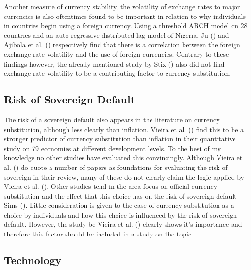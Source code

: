 \documentclass[
]{article}
\begin{document}
Another measure of currency stability, the volatility of exchange rates to major currencies is also oftentimes found to be important in relation to why individuals in countries begin using a foreign currency. Using a threshold ARCH model on 28 countries and an auto regressive distributed lag model of Nigeria, Ju () and Ajibola et al. () respectively find that there is a correlation between the foreign exchange rate volatility and the use of foreign currencies. Contrary to these findings however, the already mentioned study by Stix () also did not find exchange rate volatility to be a contributing factor to currency substitution.

\subsection{Risk of Sovereign Default}\label{risk-of-sovereign-default}

The risk of a sovereign default also appears in the literature on currency substitution, although less clearly than inflation. Vieira et al. () find this to be a stronger predictor of currency substitution than inflation in their quantitative study on 79 economies at different development levels. To the best of my knowledge no other studies have evaluated this convincingly. Although Vieira et al. () do quote a number of papers as foundations for evaluating the risk of sovereign in their review, many of these do not clearly claim the logic applied by Vieira et al. (). Other studies tend in the area focus on official currency substitution and the effect that this choice has on the risk of sovereign default Sims (). Little consideration is given to the case of currency substitution as a choice by individuals and how this choice is influenced by the risk of sovereign default. However, the study be Vieira et al. () clearly shows it's importance and therefore this factor should be included in a study on the topic

\subsection{Technology}\label{technology}
\end{document}
